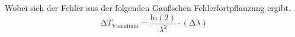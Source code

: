 Wobei sich der Fehler aus der folgenden Gaußschen Fehlerfortpflanzung ergibt.
\begin{equation}
\increment T_{\text{Vanadium}} = \frac{\text{ln}(2)}{\lambda^{2}} \cdot (\increment \lambda)
\end{equation}


